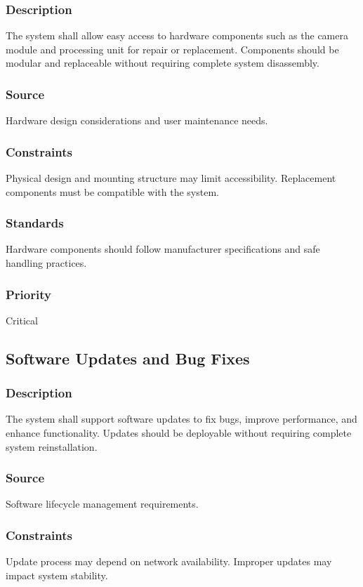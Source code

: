 \subsubsection{Description}
The system shall allow easy access to hardware components such as the camera module and processing unit for repair or replacement. Components should be modular and replaceable without requiring complete system disassembly.

\subsubsection{Source}
Hardware design considerations and user maintenance needs.

\subsubsection{Constraints}
Physical design and mounting structure may limit accessibility. Replacement components must be compatible with the system.

\subsubsection{Standards}
Hardware components should follow manufacturer specifications and safe handling practices.

\subsubsection{Priority}
Critical


\subsection{Software Updates and Bug Fixes}
\subsubsection{Description}
The system shall support software updates to fix bugs, improve performance, and enhance functionality. Updates should be deployable without requiring complete system reinstallation.

\subsubsection{Source}
Software lifecycle management requirements.

\subsubsection{Constraints}
Update process may depend on network availability. Improper updates may impact system stability.

